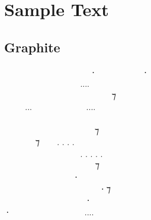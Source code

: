 \documentclass[11pt,a4paper]{article}
\begin{document}
\newpage

\section{Sample Text}

\subsection{Graphite}
\formalGR
  ‍   ⸱‍  ‍ ⸱ \\
    ‍....  ‍  \\
  ‍   ‍ ‍ ⁊ ‍  \\
...  ....   \\
         ‍ \\
 ‍ ‍‍   ⁊  ‍ ‍ \\
 ‍ ⁊  . . . .  ‍ ‍‍   \\
   ‍ . . . . . ‍ ‍   \\
      ⁊    \\
   ‍⸱‍   ‍  \\
     ‍⸱ ⁊  ‍ \\
    ⸱    \\
⸱  ‍  .... ‍‍    \\
\end{document}
